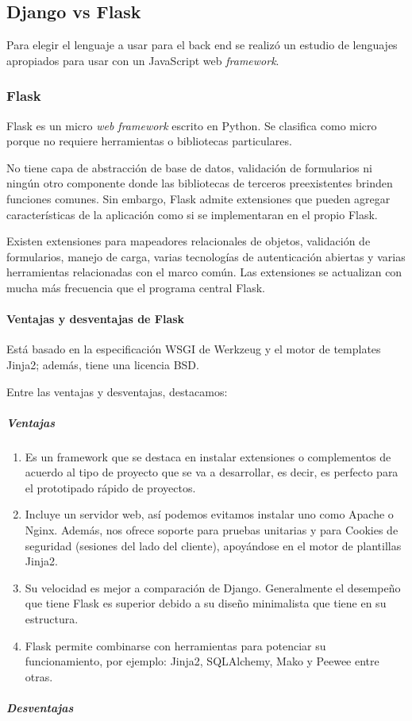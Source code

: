 \subsection{Django vs Flask}
Para elegir el lenguaje a usar para el back end se realizó un estudio de lenguajes apropiados para usar con un JavaScript web \textit{framework}.

\subsubsection*{Flask}
Flask es un micro \textit{web framework} escrito en Python. Se clasifica como micro porque no requiere herramientas o bibliotecas particulares.


No tiene capa de abstracción de base de datos, validación de formularios ni ningún otro componente donde las bibliotecas de terceros preexistentes brinden funciones comunes. Sin embargo, Flask admite extensiones que pueden agregar características de la aplicación como si se implementaran en el propio Flask.


Existen extensiones para mapeadores relacionales de objetos, validación de formularios, manejo de carga, varias tecnologías de autenticación abiertas y varias herramientas relacionadas con el marco común. Las extensiones se actualizan con mucha más frecuencia que el programa central Flask.


\paragraph*{Ventajas y desventajas de Flask}
Está basado en la especificación WSGI de Werkzeug y el motor de templates Jinja2; además, tiene una licencia BSD.


Entre las ventajas y desventajas, destacamos:

\subparagraph*{Ventajas}
\begin{enumerate}
    \item Es un framework que se destaca en instalar extensiones o complementos de acuerdo al tipo de proyecto que se va a desarrollar, es decir, es perfecto para el prototipado rápido de proyectos.
    \item Incluye un servidor web, así podemos evitamos instalar uno como Apache o Nginx. Además, nos ofrece soporte para pruebas unitarias y para Cookies de seguridad (sesiones del lado del cliente), apoyándose en el motor de plantillas ​Jinja2​.
    \item Su velocidad es mejor a comparación de Django. Generalmente el desempeño que tiene Flask es superior debido a su diseño minimalista que tiene en su estructura.
    \item  Flask permite combinarse con herramientas para potenciar su funcionamiento, por ejemplo: Jinja2, SQLAlchemy, Mako y Peewee entre otras.
\end{enumerate}
\subparagraph*{Desventajas}

